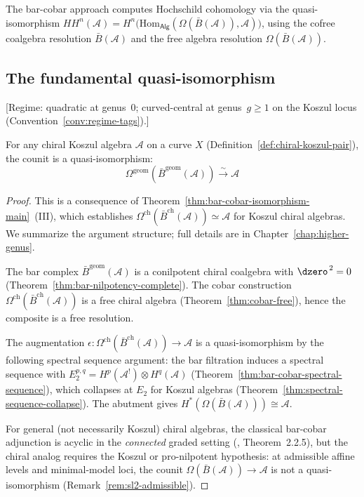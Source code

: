 The bar-cobar approach computes Hochschild cohomology via the quasi-isomorphism
$HH^n(\mathcal{A}) = H^n\bigl(\mathrm{Hom}_{\mathsf{Alg}}(\Omega(\bar{B}(\mathcal{A})),
\mathcal{A})\bigr)$,
using the cofree coalgebra resolution $\bar{B}(\mathcal{A})$ and the free algebra resolution $\Omega(\bar{B}(\mathcal{A}))$.

\subsection{The fundamental quasi-isomorphism}

\begin{theorem}\label{thm:bar-cobar-resolution}
\textup{[Regime: quadratic at genus~$0$; curved-central at genus~$g \geq 1$
on the Koszul locus
\textup{(}Convention~\textup{\ref{conv:regime-tags})}.]}

For any chiral Koszul algebra $\mathcal{A}$ on a curve $X$
\textup{(}Definition~\textup{\ref{def:chiral-koszul-pair})},
the counit is a quasi-isomorphism:
\[\Omega^{\text{geom}}(\bar{B}^{\text{geom}}(\mathcal{A})) \xrightarrow{\sim} \mathcal{A}\]
\end{theorem}

\begin{proof}
This is a consequence of Theorem~\ref{thm:bar-cobar-isomorphism-main}~(III), which establishes $\Omega^{\mathrm{ch}}(\bar{B}^{\mathrm{ch}}(\mathcal{A})) \simeq \mathcal{A}$ for Koszul chiral algebras.  We summarize the argument structure; full details are in Chapter~\ref{chap:higher-genus}.

The bar complex $\bar{B}^{\mathrm{geom}}(\mathcal{A})$ is a conilpotent
chiral coalgebra with $\dzero^{\,2} = 0$
\textup{(}Theorem~\textup{\ref{thm:bar-nilpotency-complete}}\textup{)}.
The cobar construction $\Omega^{\mathrm{ch}}(\bar{B}^{\mathrm{ch}}(\mathcal{A}))$
is a free chiral algebra
\textup{(}Theorem~\textup{\ref{thm:cobar-free}}\textup{)}, hence the
composite is a free resolution.

The augmentation $\epsilon\colon \Omega^{\mathrm{ch}}(\bar{B}^{\mathrm{ch}}(\mathcal{A})) \to \mathcal{A}$ is a quasi-isomorphism by the following spectral sequence argument: the bar filtration induces a spectral sequence with $E_2^{p,q} = H^p(\mathcal{A}^!) \otimes H^q(\mathcal{A})$ (Theorem~\ref{thm:bar-cobar-spectral-sequence}), which collapses at $E_2$ for Koszul algebras (Theorem~\ref{thm:spectral-sequence-collapse}).  The abutment gives $H^*(\Omega(\bar{B}(\mathcal{A}))) \cong \mathcal{A}$.

For general (not necessarily Koszul) chiral algebras, the classical
bar-cobar adjunction is acyclic in the \emph{connected} graded
setting (\cite{LV12}, Theorem~2.2.5), but the chiral
analog requires the Koszul or pro-nilpotent hypothesis: at
admissible affine levels and minimal-model loci, the counit
$\Omega(\bar{B}(\mathcal{A})) \to \mathcal{A}$ is not a
quasi-isomorphism (Remark~\ref{rem:sl2-admissible}).
\end{proof}

